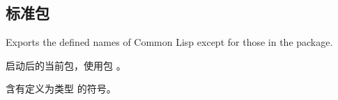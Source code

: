 \subsection{标准包}
\begin{LIST}{1cm}

  {
    Exports the defined names of Common Lisp except for those in the
     package.
  }

  {
    启动后的当前包，使用包 。
  }

  {
    含有定义为类型  的符号。
  }

\end{LIST}

